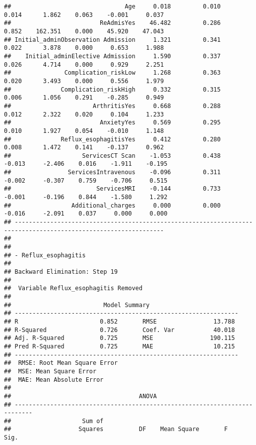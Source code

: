 \documentclass[
]{article}
\begin{document}
\begin{verbatim}
##                                Age     0.018         0.010        0.014      1.862    0.063    -0.001     0.037 
##                         ReAdmisYes    46.482         0.286        0.852    162.351    0.000    45.920    47.043 
## Initial_adminObservation Admission     1.321         0.341        0.022      3.878    0.000     0.653     1.988 
##    Initial_adminElective Admission     1.590         0.337        0.026      4.714    0.000     0.929     2.251 
##               Complication_riskLow     1.268         0.363        0.020      3.493    0.000     0.556     1.979 
##              Complication_riskHigh     0.332         0.315        0.006      1.056    0.291    -0.285     0.949 
##                       ArthritisYes     0.668         0.288        0.012      2.322    0.020     0.104     1.233 
##                         AnxietyYes     0.569         0.295        0.010      1.927    0.054    -0.010     1.148 
##              Reflux_esophagitisYes     0.412         0.280        0.008      1.472    0.141    -0.137     0.962 
##                    ServicesCT Scan    -1.053         0.438       -0.013     -2.406    0.016    -1.911    -0.195 
##                ServicesIntravenous    -0.096         0.311       -0.002     -0.307    0.759    -0.706     0.515 
##                        ServicesMRI    -0.144         0.733       -0.001     -0.196    0.844    -1.580     1.292 
##                 Additional_charges     0.000         0.000       -0.016     -2.091    0.037     0.000     0.000 
## ----------------------------------------------------------------------------------------------------------------
## 
## 
## - Reflux_esophagitis 
## 
## Backward Elimination: Step 19 
## 
##  Variable Reflux_esophagitis Removed 
## 
##                          Model Summary                          
## ---------------------------------------------------------------
## R                       0.852       RMSE                13.788 
## R-Squared               0.726       Coef. Var           40.018 
## Adj. R-Squared          0.725       MSE                190.115 
## Pred R-Squared          0.725       MAE                 10.215 
## ---------------------------------------------------------------
##  RMSE: Root Mean Square Error 
##  MSE: Mean Square Error 
##  MAE: Mean Absolute Error 
## 
##                                    ANOVA                                    
## ---------------------------------------------------------------------------
##                    Sum of                                                  
##                   Squares          DF    Mean Square       F          Sig. 

\end{verbatim}
\end{document}
